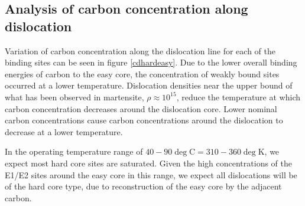 \documentclass[a4paper,11pt]{article}
\begin{document}
\subsection{Analysis of carbon concentration along dislocation}
\label{sec:org610f367}

Variation of carbon concentration along the dislocation line for each of the binding sites can be
seen in figure \ref{cdhardeasy}. Due to the lower overall binding energies of carbon to the easy
core, the concentration of weakly bound sites occurred at a lower temperature. Dislocation
densities near the upper bound of what has been observed in martensite, \(\rho \approx10^{15}\), reduce
the temperature at which carbon concentration decreases around the dislocation core. Lower
nominal carbon concentrations cause carbon concentrations around the dislocation to decrease at a
lower temperature.

In the operating temperature range of \(40-90\deg\text{C} = 310-360\deg\text{K}\), we expect most hard
core sites are saturated. Given the high concentrations of the E1/E2 sites around the easy core
in this range, we expect all dislocations will be of the hard core type, due to reconstruction of
the easy core by the adjacent carbon.
\end{document}
